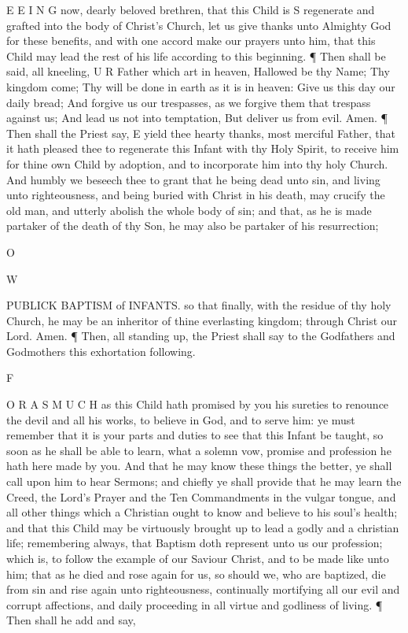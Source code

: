 E E I N G now, dearly beloved brethren, that this Child is S regenerate and grafted into the body of Christ's Church, let us give thanks unto Almighty God for these benefits, and with one accord make our prayers unto him, that this Child may lead the rest of his life according to this beginning. ¶ Then shall be said, all kneeling, U R Father which art in heaven, Hallowed be thy Name; Thy kingdom come; Thy will be done in earth as it is in heaven: Give us this day our daily bread; And forgive us our trespasses, as we forgive them that trespass against us; And lead us not into temptation, But deliver us from evil. Amen. ¶ Then shall the Priest say, E yield thee hearty thanks, most merciful Father, that it hath pleased thee to regenerate this Infant with thy Holy Spirit, to receive him for thine own Child by adoption, and to incorporate him into thy holy Church. And humbly we beseech thee to grant that he being dead unto sin, and living unto righteousness, and being buried with Christ in his death, may crucify the old man, and utterly abolish the whole body of sin; and that, as he is made partaker of the death of thy Son, he may also be partaker of his resurrection;

O

W

PUBLICK BAPTISM of INFANTS. so that finally, with the residue of thy holy Church, he may be an inheritor of thine everlasting kingdom; through Christ our Lord. Amen. ¶ Then, all standing up, the Priest shall say to the Godfathers and Godmothers this exhortation following.

F

O R A S M U C H as this Child hath promised by you his sureties to renounce the devil and all his works, to believe in God, and to serve him: ye must remember that it is your parts and duties to see that this Infant be taught, so soon as he shall be able to learn, what a solemn vow, promise and profession he hath here made by you. And that he may know these things the better, ye shall call upon him to hear Sermons; and chiefly ye shall provide that he may learn the Creed, the Lord’s Prayer and the Ten Commandments in the vulgar tongue, and all other things which a Christian ought to know and believe to his soul's health; and that this Child may be virtuously brought up to lead a godly and a christian life; remembering always, that Baptism doth represent unto us our profession; which is, to follow the example of our Saviour Christ, and to be made like unto him; that as he died and rose again for us, so should we, who are baptized, die from sin and rise again unto righteousness, continually mortifying all our evil and corrupt affections, and daily proceeding in all virtue and godliness of living. ¶ Then shall he add and say,

